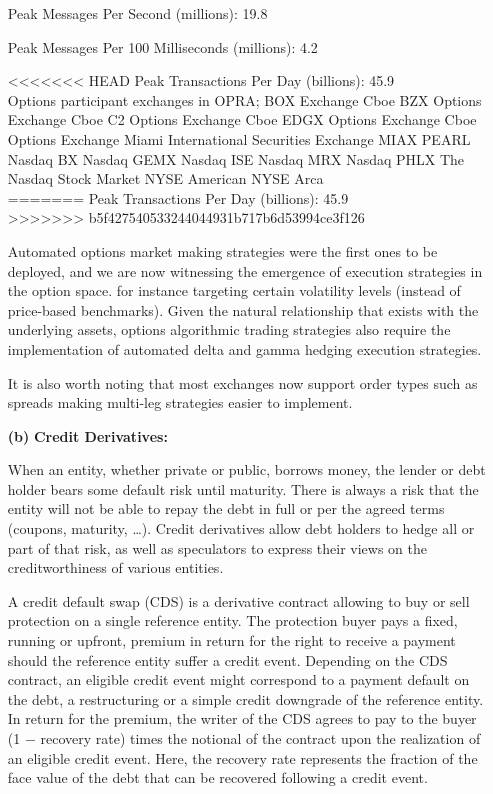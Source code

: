 \begin{enumerate}
Peak Messages Per Second (millions): 19.8

Peak Messages Per 100 Milliseconds (millions): 4.2

<<<<<<< HEAD
Peak Transactions Per Day (billions): 45.9\\

Options participant exchanges in OPRA; 
BOX Exchange
Cboe BZX Options Exchange
Cboe C2 Options Exchange
Cboe EDGX Options Exchange
Cboe Options Exchange
Miami International Securities Exchange
MIAX PEARL
Nasdaq BX
Nasdaq GEMX
Nasdaq ISE
Nasdaq MRX
Nasdaq PHLX
The Nasdaq Stock Market
NYSE American
NYSE Arca \\

=======
Peak Transactions Per Day (billions): 45.9 \\
>>>>>>> b5f427540533244044931b717b6d53994ce3f126

Automated options market making strategies were the first ones to be deployed, and we are now witnessing the emergence of execution strategies in the option space. for instance targeting certain volatility levels (instead of price-based benchmarks). Given the natural relationship that exists with the underlying assets, options algorithmic trading strategies also require the implementation of automated delta and gamma hedging execution strategies.


It is also worth noting that most exchanges now support order types such as spreads making multi-leg strategies easier to implement.


\item[\textbf{(b)}] \textbf{Credit Derivatives:} 

When an entity, whether private or public, borrows money, the lender or debt holder bears some default risk until maturity. There is always a risk that the entity will not be able to repay the debt in full or per the agreed terms (coupons, maturity, \dots). Credit derivatives allow debt holders to hedge all or part of that risk, as well as speculators to express their views on the creditworthiness of various entities. 


A credit default swap (CDS) is a derivative contract allowing to buy or sell protection on a single reference entity. The protection buyer pays a fixed, running or upfront, premium in return for the right to receive a payment should the reference entity suffer a credit event. Depending on the CDS contract, an eligible credit event might correspond to a payment default on the debt, a restructuring or a simple credit downgrade of the reference entity. In return for the premium, the writer of the CDS agrees to pay to the buyer (1 $-$ recovery rate) times the notional of the contract upon the realization of an eligible credit event. Here, the recovery rate represents the fraction of the face value of the debt that can be recovered following a credit event.



\end{enumerate}
